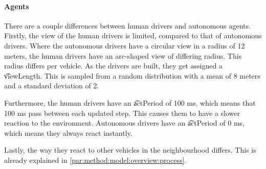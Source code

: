 

\paragraph{Agents}
There are a couple differences between human drivers and autonomous agents. Firstly, the view of the human drivers is limited, compared to that of autonomous drivers. Where the autonomous drivers have a circular view in a radius of 12 meters, the human drivers have an arc-shaped view of differing radius. This radius differs per vehicle. As the drivers are built, they get assigned a \t{viewLength}. This is sampled from a random distribution with a mean of 8 meters and a standard deviation of 2. 

Furthermore, the human drivers have an \t{actPeriod} of 100 \si{\milli\second}, which means that 100 \si{\milli\second} pass between each updated step. This causes them to have a slower reaction to the environment. Autonomous drivers have an \t{actPeriod} of 0 \si{\milli\second}, which means they always react instantly. 

Lastly, the way they react to other vehicles in the neighbourhood differs. This is already explained in \cref{par:method:model:overview:process}. 




